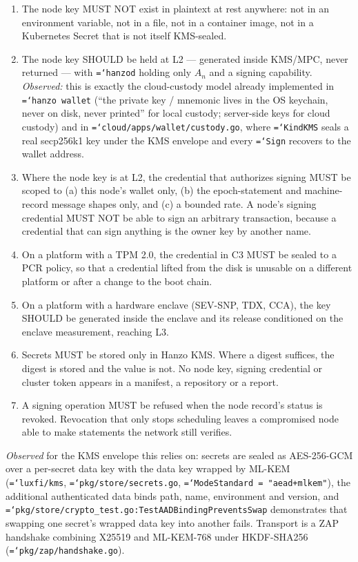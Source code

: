 \documentclass[11pt,a4paper]{article}
\newcommand{\code}[1]{\texttt{\hyphenchar\font=`\-\relax #1}}
\begin{document}
\begin{enumerate}[label=\textbf{C\arabic*.},leftmargin=2.6em]
\item The node key MUST NOT exist in plaintext at rest anywhere: not in an
  environment variable, not in a file, not in a container image, not in a
  Kubernetes Secret that is not itself KMS-sealed.
\item The node key SHOULD be held at L2 --- generated inside KMS/MPC, never
  returned --- with \code{hanzod} holding only $A_n$ and a signing capability.
  \emph{Observed:} this is exactly the cloud-custody model already implemented in
  \code{hanzo wallet} (``the private key / mnemonic lives in the OS keychain,
  never on disk, never printed'' for local custody; server-side keys for cloud
  custody) and in \code{cloud/apps/wallet/custody.go}, where \code{KindKMS} seals
  a real secp256k1 key under the KMS envelope and every \code{Sign} recovers to
  the wallet address.
\item Where the node key is at L2, the credential that authorizes signing MUST be
  scoped to (a) this node's wallet only, (b) the epoch-statement and
  machine-record message shapes only, and (c) a bounded rate. A node's signing
  credential MUST NOT be able to sign an arbitrary transaction, because a
  credential that can sign anything is the owner key by another name.
\item On a platform with a TPM 2.0, the credential in C3 MUST be sealed to a PCR
  policy, so that a credential lifted from the disk is unusable on a different
  platform or after a change to the boot chain.
\item On a platform with a hardware enclave (SEV-SNP, TDX, CCA), the key SHOULD be
  generated inside the enclave and its release conditioned on the enclave
  measurement, reaching L3.
\item Secrets MUST be stored only in Hanzo KMS. Where a digest suffices, the
  digest is stored and the value is not. No node key, signing credential or
  cluster token appears in a manifest, a repository or a report.
\item A signing operation MUST be refused when the node record's status is revoked.
  Revocation that only stops scheduling leaves a compromised node able to make
  statements the network still verifies.
\end{enumerate}

\emph{Observed} for the KMS envelope this relies on: secrets are sealed as
AES-256-GCM over a per-secret data key with the data key wrapped by ML-KEM
(\code{luxfi/kms}, \code{pkg/store/secrets.go}, \code{ModeStandard = "aead+mlkem"}),
the additional authenticated data binds path, name, environment and version, and
\code{pkg/store/crypto\_test.go:TestAADBindingPreventsSwap} demonstrates that
swapping one secret's wrapped data key into another fails. Transport is a ZAP
handshake combining X25519 and ML-KEM-768 under HKDF-SHA256
(\code{pkg/zap/handshake.go}).
\end{document}
